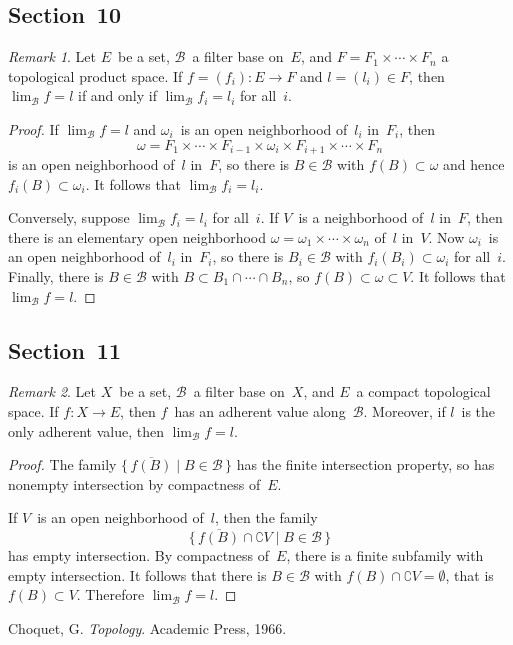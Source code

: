 \documentclass[letterpaper,12pt]{article}
\newcommand{\B}{\mathcal{B}}
\newcommand{\sect}{\cap}
\newcommand{\closure}[1]{\overline{#1}}
\theoremstyle{definition}
\theoremstyle{remark}
\newtheorem*{rmk}{Remark}
\begin{document}
\subsection*{Section~10}
\begin{rmk}
Let \(E\)~be a set, \(\B\)~a filter base on~\(E\), and \(F=F_1\times\cdots\times F_n\) a topological product space. If \(f=(f_i):E\to F\) and \(l=(l_i)\in F\), then \(\lim_{\B}f=l\) if and only if \(\lim_{\B}f_i=l_i\) for all~\(i\).
\end{rmk}
\begin{proof}
If \(\lim_{\B}f=l\) and \(\omega_i\)~is an open neighborhood of~\(l_i\) in~\(F_i\), then
\[\omega=F_1\times\cdots\times F_{i-1}\times\omega_i\times F_{i+1}\times\cdots\times F_n\]
is an open neighborhood of~\(l\) in~\(F\), so there is \(B\in\B\) with \(f(B)\subset\omega\) and hence \(f_i(B)\subset\omega_i\). It follows that \(\lim_{\B}f_i=l_i\).

Conversely, suppose \(\lim_{\B}f_i=l_i\) for all~\(i\). If \(V\)~is a neighborhood of~\(l\) in~\(F\), then there is an elementary open neighborhood \(\omega=\omega_1\times\cdots\times\omega_n\) of~\(l\) in~\(V\). Now \(\omega_i\)~is an open neighborhood of~\(l_i\) in~\(F_i\), so there is \(B_i\in\B\) with \(f_i(B_i)\subset\omega_i\) for all~\(i\). Finally, there is \(B\in\B\) with \(B\subset B_1\sect\cdots\sect B_n\), so \(f(B)\subset\omega\subset V\). It follows that \(\lim_{\B}f=l\).
\end{proof}

\subsection*{Section~11}
\begin{rmk}
Let \(X\)~be a set, \(\B\)~a filter base on~\(X\), and \(E\)~a compact topological space. If \(f:X\to E\), then \(f\)~has an adherent value along~\(\B\). Moreover, if \(l\)~is the only adherent value, then \(\lim_{\B}f=l\).
\end{rmk}
\begin{proof}
The family \(\{\,\closure{f(B)}\mid B\in\B\,\}\) has the finite intersection property, so has nonempty intersection by compactness of~\(E\).

If \(V\)~is an open neighborhood of~\(l\), then the family
\[\{\,\closure{f(B)}\sect\complement V\mid B\in\B\,\}\]
has empty intersection. By compactness of~\(E\), there is a finite subfamily with empty intersection. It follows that there is \(B\in\B\) with \(f(B)\sect\complement V=\emptyset\), that is \(f(B)\subset V\). Therefore \(\lim_{\B}f=l\).
\end{proof}

\newpage
\begin{thebibliography}{0}
 Choquet, G. \textit{Topology}. Academic Press, 1966.
\end{thebibliography}
\end{document}
